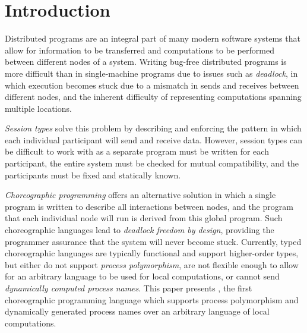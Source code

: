 \section{Introduction}
\label{sec:introduction}

Distributed programs are an integral part of many modern software systems that allow for information to be transferred and computations to be performed between different nodes of a system.
Writing bug-free distributed programs is more difficult than in single-machine programs due to issues such as \emph{deadlock}, in which execution becomes stuck due to a mismatch in sends and receives between different nodes, and the inherent difficulty of representing computations spanning multiple locations.

\emph{Session types} solve this problem by describing and enforcing the pattern in which each individual participant will send and receive data.
However, session types can be difficult to work with as a separate program must be written for each participant, the entire system must be checked for mutual compatibility, and the participants must be fixed and statically known.

\emph{Choreographic programming} offers an alternative solution in which a single program is written to describe all interactions between nodes, and the program that each individual node will run is derived from this global program.
Such choreographic languages lead to \emph{deadlock freedom by design}, providing the programmer assurance that the system will never become stuck.
Currently, typed choreographic languages are typically functional and support higher-order types, but either do not support \emph{process polymorphism}, are not flexible enough to allow for an arbitrary language to be used for local computations, or cannot send \emph{dynamically computed process names}.
This paper presents \langname{}, the first choreographic programming language which supports process polymorphism and dynamically generated process names over an arbitrary language of local computations.

